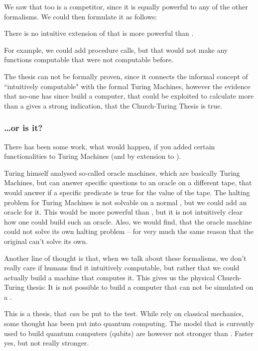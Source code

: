 We saw that \WHILE too is a competitor, since it is equally powerful to any 
of the other formalisms. We could then formulate it as follows:

\begin{thesis}
	There is no intuitive extension of \WHILE that is more powerful than \WHILE.
\end{thesis}

For example, we could add procedure calls, but that would not make any 
functions computable that were not computable before.

The thesis can not be formally proven, since it connects the informal concept 
of ``intuitively computable" with the formal Turing Machines, however the 
evidence that no-one has since build a computer, that could be exploited to
calculate more than a \TM gives a strong indication, that the Church-Turing
Thesis is true.

\subsubsection{\dots or is it?}
There has been some work, what would happen, if you added certain 
functionalities to Turing Machines (and by extension to \WHILE). 

Turing himself analysed so-called oracle machines, which are basically Turing 
Machines, but can answer specific questions to an oracle on a different tape, 
that would answer if a specific predicate is true for the value of the tape.
The halting problem for Turing Machines is not solvable on a normal \TM, but 
we could add an oracle for it. This would be more powerful than \TM, but it 
is not intuitively clear how one could build such an oracle. Also, we would 
find, that the oracle machine could not solve its own halting problem -- for 
very much the same reason that the original \TM can't solve its own.

Another line of thought is that, when we talk about these formalisms, we 
don't really care if humans find it intuitively computable, but rather that 
we could actually build a machine that computes it. This gives us the 
physical Church-Turing thesis: It is not possible to build a computer that 
can not be simulated on a \TM.

This is a thesis, that \emph{can} be put to the test. While \TM rely on 
classical mechanics, some thought has been put into quantum computing. The 
model that is currently used to build quantum computers (qubits) are however
not stronger than \TM. Faster yes, but not really stronger.


